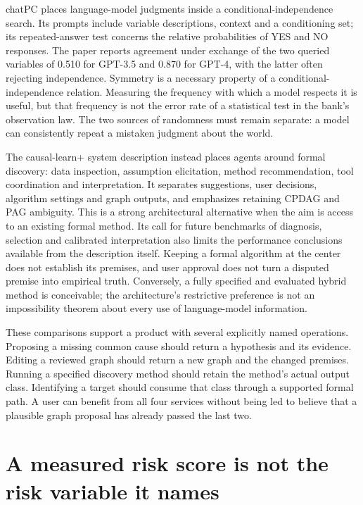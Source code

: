 chatPC places language-model judgments inside a conditional-independence
search. Its prompts include variable descriptions, context and a
conditioning set; its repeated-answer test concerns the relative
probabilities of YES and NO responses. The paper reports agreement under
exchange of the two queried variables of 0.510 for GPT-3.5 and 0.870 for
GPT-4, with the latter often rejecting independence. Symmetry is a
necessary property of a conditional-independence relation. Measuring the
frequency with which a model respects it is useful, but that frequency
is not the error rate of a statistical test in the bank's observation
law. The two sources of randomness must remain separate: a model can
consistently repeat a mistaken judgment about the world.
\citep{v12_la_2406_07378}

The causal-learn+ system description instead places agents around formal
discovery: data inspection, assumption elicitation, method
recommendation, tool coordination and interpretation. It separates
suggestions, user decisions, algorithm settings and graph outputs, and
emphasizes retaining CPDAG and PAG ambiguity. This is a strong
architectural alternative when the aim is access to an existing formal
method. Its call for future benchmarks of diagnosis, selection and
calibrated interpretation also limits the performance conclusions
available from the description itself. Keeping a formal algorithm at the
center does not establish its premises, and user approval does not turn
a disputed premise into empirical truth. Conversely, a fully specified
and evaluated hybrid method is conceivable; the architecture's
restrictive preference is not an impossibility theorem about every use
of language-model information. \citep{v12_la_2606_23608}

These comparisons support a product with several explicitly named
operations. Proposing a missing common cause should return a hypothesis
and its evidence. Editing a reviewed graph should return a new graph and
the changed premises. Running a specified discovery method should retain
the method's actual output class. Identifying a target should consume
that class through a supported formal path. A user can benefit from all
four services without being led to believe that a plausible graph
proposal has already passed the last two.

\hypertarget{a-measured-risk-score-is-not-the-risk-variable-it-names}{%
\section{A measured risk score is not the risk variable it
names}\label{a-measured-risk-score-is-not-the-risk-variable-it-names}}

